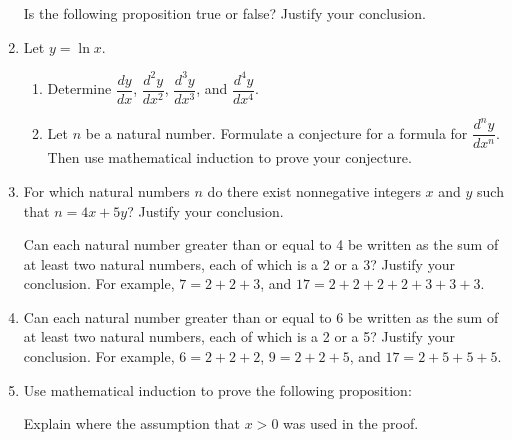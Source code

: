 \begin{enumerate}
\begin{enumerate}
\end{enumerate}

\xitem Is the following proposition true or false?  Justify your conclusion. \label{exer:sec52-3}


\item Let $y = \ln x$. \label{exer:sec51-12}

\begin{enumerate}
\item Determine $\dfrac{{dy}}{{dx}}$, $\dfrac{{d^2 y}}{{dx^2 }}$, 
$\dfrac{{d^3 y}}{{dx^3 }}$, and $\dfrac{{d^4 y}}{{dx^4 }}$.

\item Let $n$ be a natural number.  Formulate a conjecture for a formula for 
$\dfrac{{d^n y}}{{dx^n }}$.  Then use mathematical induction to prove your conjecture.
\end{enumerate}

\item For which natural numbers  $n$  do there exist nonnegative integers  $x$  and  $y$  such that  $n = 4x + 5y$?  Justify your conclusion.
\label{exer:sec52-7}%

\xitem Can each natural number greater than or equal to 4 be written as the sum of at least two natural numbers, each of which is a 2 or a 3?  Justify your conclusion. 
\label{exer:sec52-4}%
For example,  $7 = 2 + 2 + 3$, and  $17 = 2 + 2 + 2 + 2 + 3 + 3 + 3$.

\item Can each natural number greater than or equal to 6 be written as the sum of at least two natural numbers, each of which is a 2 or a 5?  Justify your conclusion.
\label{exer:sec52-5}%
For example,  $6 = 2 + 2 + 2$, $9 = 2 + 2 + 5$, and  $17 = 2 + 5 + 5 + 5$.



\item Use mathematical induction to prove the following proposition:
Explain where the assumption that $x > 0$ was used in the proof.


\end{enumerate}

